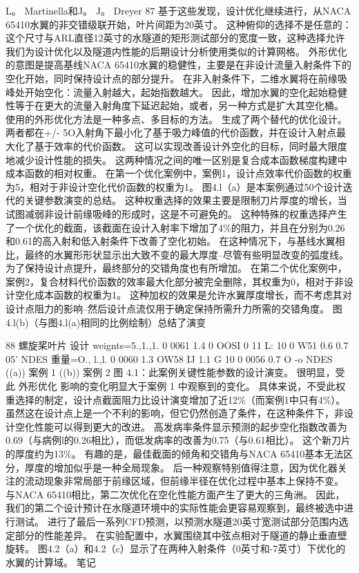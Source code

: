 \documentclass[UTF8,11pt,a4paper,openany,fontset=fandol]{ctexbook}
\begin{document}
L。 Martinella和J。 J。 Dreyer 87 基于这些发现，设计优化继续进行，从NACA 65410水翼的非交错级联开始，叶片间距为20英寸。 这种俯仰的选择不是任意的：这个尺寸与ARL直径12英寸的水隧道的矩形测试部分的宽度一致，这种选择允许我们为设计优化以及隧道内性能的后期设计分析使用类似的计算网格。 外形优化的意图是提高基线NACA 65410水翼的稳健性，主要是在非设计流量入射条件下的空化开始，同时保持设计点的部分提升。 在非入射条件下，二维水翼将在前缘吸峰处开始空化：流量入射越大，起始指数越大。 因此，增加水翼的空化起始稳健性等于在更大的流量入射角度下延迟起始，或者，另一种方式是扩大其空化桶。 使用的外形优化方法是一种多点、多目标的方法。 生成了两个替代的优化设计。 两者都在+/- 5O入射角下最小化了基于吸力峰值的代价函数，并在设计入射点最大化了基于效率的代价函数。 这可以实现改善设计外空化的目标，同时最大限度地减少设计性能的损失。 这两种情况之间的唯一区别是复合成本函数梯度构建中成本函数的相对权重。 在第一个优化案例中，案例1，设计点效率代价函数的权重为5，相对于非设计空化代价函数的权重为1。 图4.l（a）是本案例通过50个设计迭代的关键参数演变的总结。 这种权重选择的效果主要是限制刀片厚度的增长，当试图减弱非设计前缘吸峰的形成时，这是不可避免的。 这种特殊的权重选择产生了一个优化的截面，该截面在设计入射率下增加了4\%的阻力，并且在分别为0.26和0.61的高入射和低入射条件下改善了空化初始。 在这种情况下，与基线水翼相比，最终的水翼形形状显示出大致不变的最大厚度--尽管有些明显改变的弧度线。 为了保持设计点提升，最终部分的交错角度也有所增加。 在第二个优化案例中，案例2，复合材料代价函数的效率最大化部分被完全删除，其权重为0，相对于非设计空化成本函数的权重为1。 这种加权的效果是允许水翼厚度增长，而不考虑其对设计点阻力的影响--然后设计点流仅用于确定保持所需升力所需的交错角度。 图4.l(b)（与图4.l(a)相同的比例绘制）总结了演变

88 螺旋桨叶片 设计 weignts=5.,1.,1. 0 0061 1.4 0 OOSI 0 11 L: 10 0 W51 0.6 0.7 05' NDES 重量=O., l.,l. 0 0060 1.3 OW58 IJ 1.1 G 10 0 0056 0.7 O -o NDES ((a)) 案例 1 ((b)) 案例 2 图 4.1：此案例关键性能参数的设计演变。 很明显，受此 外形优化 影响的变化明显大于案例 1 中观察到的变化。 具体来说，不受此权重选择的制定，设计点截面阻力比设计演变增加了近12\%（而案例1中只有4\%）。 虽然这在设计点上是一个不利的影响，但它仍然创造了条件，在这种条件下，非设计空化性能可以得到更大的改进。 高发病率条件显示预测的起步空化指数改善为0.69（与病例l的0.26相比），而低发病率的改善为0.75（与0.61相比）。 这个新刀片的厚度约为13\%。 有趣的是，最佳截面的倾角和交错角与NACA 65410基本无法区分，厚度的增加似乎是一种全局现象。 后一种观察特别值得注意，因为优化器关注的流动现象非常局部于前缘区域，但前缘半径在优化过程中基本上保持不变。 与NACA 65410相比，第二次优化在空化性能方面产生了更大的三角洲。 因此，我们的第二个设计预计在水隧道环境中的实际性能会更容易观察到，最终被选中进行测试。 进行了最后一系列CFD预测，以预测水隧道20英寸宽测试部分范围内选定部分的性能差异。 在实验配置中，水翼围绕其中弦点相对于隧道的静止垂直壁旋转。 图4.2（a）和4.2（c）显示了在两种入射条件（0英寸和-7英寸）下优化的水翼的计算域。 笔记
\end{document}
